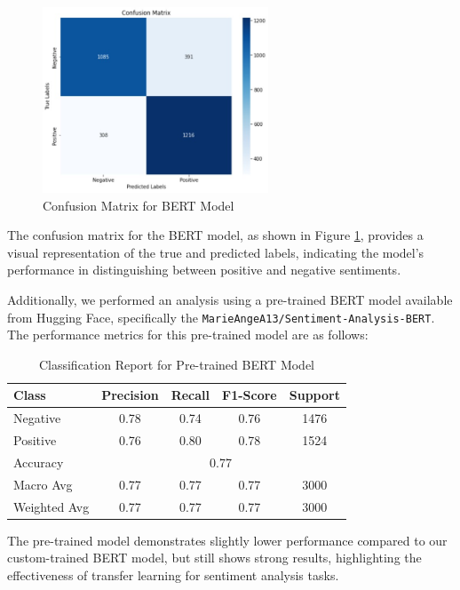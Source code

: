 \documentclass[12pt]{article}
\begin{document}
\begin{figure}[H]
    \centering
    \includegraphics[width=0.6\textwidth]{xyz.png}
    \caption{Confusion Matrix for BERT Model}
    \label{fig:bert_confusion_matrix}
\end{figure}

The confusion matrix for the BERT model, as shown in Figure \ref{fig:bert_confusion_matrix}, provides a visual representation of the true and predicted labels, indicating the model's performance in distinguishing between positive and negative sentiments.

Additionally, we performed an analysis using a pre-trained BERT model available from Hugging Face, specifically the \texttt{MarieAngeA13/Sentiment-Analysis-BERT}. The performance metrics for this pre-trained model are as follows:

\begin{table}[H]
    \centering
    \begin{tabular}{lcccc}
    \hline
    Class & Precision & Recall & F1-Score & Support \\
    \hline
    Negative & 0.78 & 0.74 & 0.76 & 1476 \\
    Positive & 0.76 & 0.80 & 0.78 & 1524 \\
    \hline
    Accuracy & \multicolumn{4}{c}{0.77} \\
    Macro Avg & 0.77 & 0.77 & 0.77 & 3000 \\
    Weighted Avg & 0.77 & 0.77 & 0.77 & 3000 \\
    \hline
    \end{tabular}
    \caption{Classification Report for Pre-trained BERT Model}
    \label{tab:pretrained_bert_classification_report}
\end{table}

The pre-trained model demonstrates slightly lower performance compared to our custom-trained BERT model, but still shows strong results, highlighting the effectiveness of transfer learning for sentiment analysis tasks.
\end{document}
